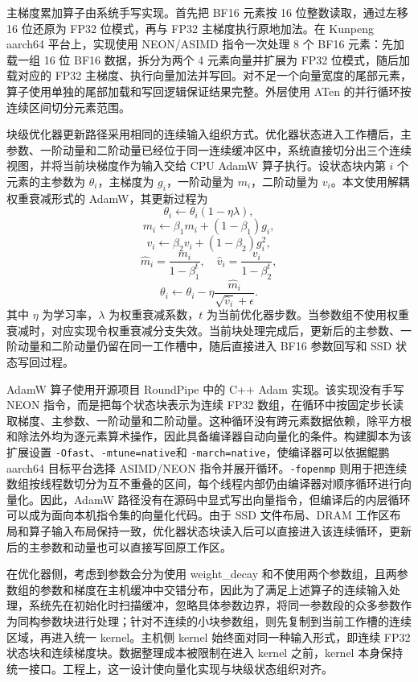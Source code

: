 \documentclass[bachelor,openany,oneside,color,AutoFakeBold=true]{buaathesis}
\begin{document}
主梯度累加算子由系统手写实现。首先把 BF16 元素按 16 位整数读取，通过左移 16 位还原为 FP32 位模式，再与 FP32 主梯度执行原地加法。在 Kunpeng aarch64 平台上，实现使用 NEON/ASIMD 指令一次处理 8 个 BF16 元素：先加载一组 16 位 BF16 数据，拆分为两个 4 元素向量并扩展为 FP32 位模式，随后加载对应的 FP32 主梯度、执行向量加法并写回。对不足一个向量宽度的尾部元素，算子使用单独的尾部加载和写回逻辑保证结果完整。外层使用 ATen 的并行循环按连续区间切分元素范围。

块级优化器更新路径采用相同的连续输入组织方式。优化器状态进入工作槽后，主参数、一阶动量和二阶动量已经位于同一连续缓冲区中，系统直接切分出三个连续视图，并将当前块梯度作为输入交给 CPU AdamW 算子执行。设状态块内第 $i$ 个元素的主参数为 $\theta_i$，主梯度为 $g_i$，一阶动量为 $m_i$，二阶动量为 $v_i$。本文使用解耦权重衰减形式的 AdamW，其更新过程为
\[
\theta_i \leftarrow \theta_i(1-\eta\lambda),
\]
\[
m_i \leftarrow \beta_1 m_i + (1-\beta_1)g_i,
\]
\[
v_i \leftarrow \beta_2 v_i + (1-\beta_2)g_i^2,
\]
\[
\hat{m}_i = \frac{m_i}{1-\beta_1^t}, \quad
\hat{v}_i = \frac{v_i}{1-\beta_2^t},
\]
\[
\theta_i \leftarrow \theta_i -
\eta \frac{\hat{m}_i}{\sqrt{\hat{v}_i}+\epsilon}.
\]
其中 $\eta$ 为学习率，$\lambda$ 为权重衰减系数，$t$ 为当前优化器步数。当参数组不使用权重衰减时，对应实现令权重衰减分支失效。当前块处理完成后，更新后的主参数、一阶动量和二阶动量仍留在同一工作槽中，随后直接进入 BF16 参数回写和 SSD 状态写回过程。

AdamW 算子使用开源项目 RoundPipe 中的 C++ Adam 实现。该实现没有手写 NEON 指令，而是把每个状态块表示为连续 FP32 数组，在循环中按固定步长读取梯度、主参数、一阶动量和二阶动量。这种循环没有跨元素数据依赖，除平方根和除法外均为逐元素算术操作，因此具备编译器自动向量化的条件。构建脚本为该扩展设置 \texttt{-Ofast}、\texttt{-mtune=native}和 \texttt{-march=native}，使编译器可以依据鲲鹏 aarch64 目标平台选择 ASIMD/NEON 指令并展开循环。\texttt{-fopenmp} 则用于把连续数组按线程数切分为互不重叠的区间，每个线程内部仍由编译器对顺序循环进行向量化。因此，AdamW 路径没有在源码中显式写出向量指令，但编译后的内层循环可以成为面向本机指令集的向量化代码。由于 SSD 文件布局、DRAM 工作区布局和算子输入布局保持一致，优化器状态块读入后可以直接进入该连续循环，更新后的主参数和动量也可以直接写回原工作区。

在优化器侧，考虑到参数会分为使用 weight\_decay 和不使用两个参数组，且两参数组的参数和梯度在主机缓冲中交错分布，因此为了满足上述算子的连续输入处理，系统先在初始化时扫描缓冲，忽略具体参数边界，将同一参数段的众多参数作为同构参数块进行处理；针对不连续的小块参数组，则先复制到当前工作槽的连续区域，再进入统一 kernel。主机侧 kernel 始终面对同一种输入形式，即连续 FP32 状态块和连续梯度块。数据整理成本被限制在进入 kernel 之前，kernel 本身保持统一接口。工程上，这一设计使向量化实现与块级状态组织对齐。
\end{document}
